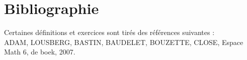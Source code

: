 \documentclass[french, 12pt]{article}
\begin{document}



\newpage
\tableofcontents






\newpage
\section{Bibliographie}
Certaines définitions et exercices sont tirés des références suivantes :\\

ADAM, LOUSBERG, BASTIN, BAUDELET, BOUZETTE, CLOSE, Espace Math 6, de boek, 2007.
\end{document}
